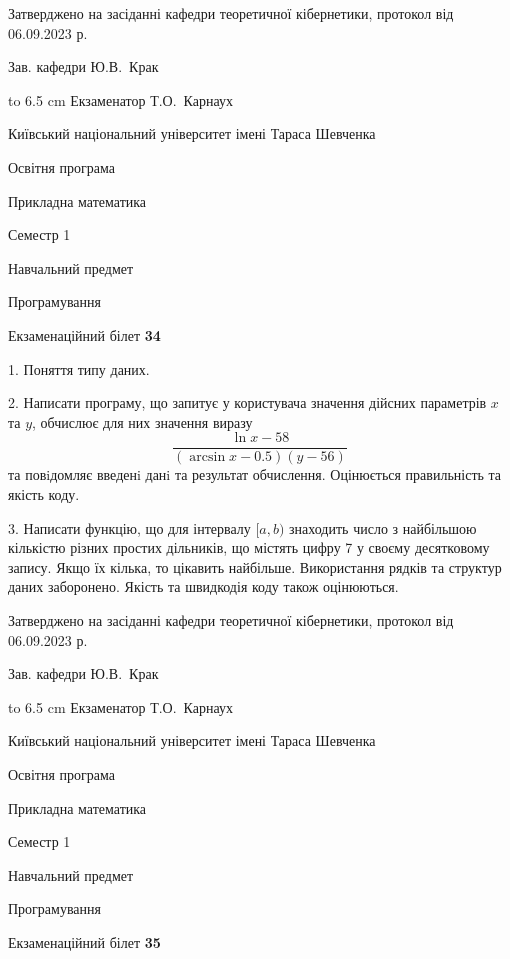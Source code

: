 \documentclass[12pt, ukrainian]{article}
\begin{document}
{\smallskip\smallskip \begin {scriptsize} Затверджено на засіданні кафедри теоретичної кібернетики, протокол   від   06.09.2023 р.\par\smallskip\smallskip\smallskip\smallskip
{\parbox {6.5 cm} {Зав. кафедри \dotfill Ю.В.~Крак}}\hspace {0.7cm} {\hbox to 6.5 cm { Екзаменатор \dotfill Т.О.~Карнаух}} \end{scriptsize}}
\newpage
{{\begin {scriptsize}\par
{ \center  Київський національний університет імені Тараса Шевченка \par}
{\parbox {5 cm}{Освітня програма \hfill}{\parbox {7 cm}{Прикладна математика\hfill}}\parbox {6 cm}{\hfill Семестр 1}}\par
{\parbox {5 cm} {Навчальний предмет \hfill}\parbox {7 cm}{Програмування \hfill}\parbox {6cm}{\hfill}\par}\vspace{-15pt} \end{scriptsize}}{\center Екзаменаційний білет \No \textbf { 34 }\par}}
{%
1. Поняття типу даних.%
\par
2. Написати програму, що запитує у користувача значення дійсних параметрів $x$ та $y$, обчислює для них значення виразу 
$$\frac{\ln x - 58}{(\arcsin x - 0.5) (y - 56)}$$ 
та повiдомляє введенi данi та результат обчислення.
 Оцінюється правильність та якість коду.

\par
3. Написати функцію, що для інтервалу $[a, b)$ знаходить число з найбільшою кількістю різних простих дільників, що містять цифру 7 у своєму десятковому запису. Якщо їх кілька, то цікавить найбільше.  Використання рядків та структур даних заборонено. Якість та швидкодія коду також оцінюються. 

}
{\smallskip\smallskip \begin {scriptsize} Затверджено на засіданні кафедри теоретичної кібернетики, протокол   від   06.09.2023 р.\par\smallskip\smallskip\smallskip\smallskip
{\parbox {6.5 cm} {Зав. кафедри \dotfill Ю.В.~Крак}}\hspace {0.7cm} {\hbox to 6.5 cm { Екзаменатор \dotfill Т.О.~Карнаух}} \end{scriptsize}}
\vspace{0.9cm}
{{\begin {scriptsize}\par
{ \center  Київський національний університет імені Тараса Шевченка \par}
{\parbox {5 cm}{Освітня програма \hfill}{\parbox {7 cm}{Прикладна математика\hfill}}\parbox {6 cm}{\hfill Семестр 1}}\par
{\parbox {5 cm} {Навчальний предмет \hfill}\parbox {7 cm}{Програмування \hfill}\parbox {6cm}{\hfill}\par}\vspace{-15pt} \end{scriptsize}}{\center Екзаменаційний білет \No \textbf { 35 }\par}}
\end{document}
